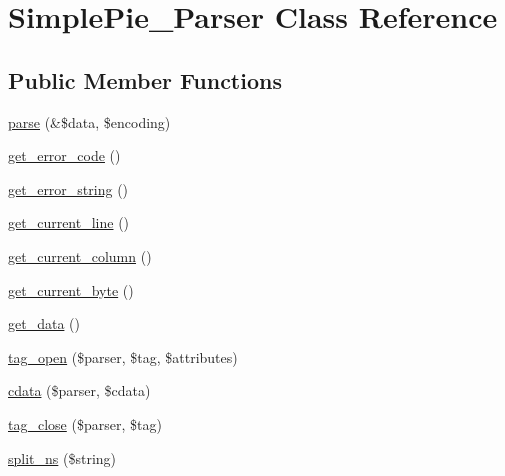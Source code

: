\hypertarget{class_simple_pie___parser}{\section{Simple\-Pie\-\_\-\-Parser Class Reference}
\label{class_simple_pie___parser}
}
\subsection*{Public Member Functions}
\begin{DoxyCompactItemize}
\item 
\hyperlink{class_simple_pie___parser_aaaaf7439f484f552b1bf125b77046b17}{parse} (\&\$data, \$encoding)
\item 
\hyperlink{class_simple_pie___parser_a4387df20628366c43a75cfe9058b3e7e}{get\-\_\-error\-\_\-code} ()
\item 
\hyperlink{class_simple_pie___parser_a3e83c15baad5d2a42edc5ca961ea4319}{get\-\_\-error\-\_\-string} ()
\item 
\hyperlink{class_simple_pie___parser_a12f65aed4c9ff0dc18307507ca68affa}{get\-\_\-current\-\_\-line} ()
\item 
\hyperlink{class_simple_pie___parser_a7c8716c6656812be1e171df976737a51}{get\-\_\-current\-\_\-column} ()
\item 
\hyperlink{class_simple_pie___parser_a272e68cc6a57c0082e620a379fbfee61}{get\-\_\-current\-\_\-byte} ()
\item 
\hyperlink{class_simple_pie___parser_a4a65cc725d438458d2745fe2e2da6aa6}{get\-\_\-data} ()
\item 
\hyperlink{class_simple_pie___parser_a788b42d960b3d161004334991aafdb0d}{tag\-\_\-open} (\$parser, \$tag, \$attributes)
\item 
\hyperlink{class_simple_pie___parser_a8869897887e70501392bada33b3c27d3}{cdata} (\$parser, \$cdata)
\item 
\hyperlink{class_simple_pie___parser_aecccb0ff68875c50c0b4201a08611f29}{tag\-\_\-close} (\$parser, \$tag)
\item 
\hyperlink{class_simple_pie___parser_a9cbc2243cf2c7dccff4e612c545ef480}{split\-\_\-ns} (\$string)
\end{DoxyCompactItemize}
